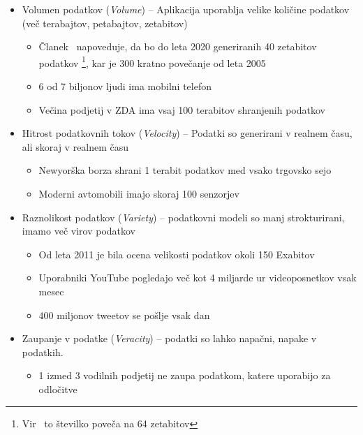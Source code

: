 \begin{itemize} \label{list:four_v}
    \item Volumen podatkov (\emph{Volume}) -- Aplikacija uporablja velike količine podatkov (več terabajtov, petabajtov, zetabitov)
          \begin{itemize}
              \item Članek~\cite{modeling_requirements_big_data} napoveduje, da bo do leta 2020 generiranih 40 zetabitov podatkov
                    \footnote{Vir~\cite{big_data_amount_statista} to številko poveča na 64 zetabitov}, kar je 300 kratno povečanje od leta 2005
              \item 6 od 7 biljonov ljudi ima mobilni telefon
              \item Večina podjetij v ZDA ima vsaj 100 terabitov shranjenih podatkov
          \end{itemize}

    \item Hitrost podatkovnih tokov (\emph{Velocity}) -- Podatki so generirani v realnem času, ali skoraj v realnem času
          \begin{itemize}
              \item Newyorška borza shrani 1 terabit podatkov med vsako trgovsko sejo
              \item Moderni avtomobili imajo skoraj 100 senzorjev
          \end{itemize}

    \item Raznolikost podatkov (\emph{Variety}) -- podatkovni modeli so manj strokturirani, imamo več virov podatkov
          \begin{itemize}
              \item Od leta 2011 je bila ocena velikosti podatkov okoli 150 Exabitov
              \item Uporabniki YouTube pogledajo več kot 4 miljarde ur videoposnetkov vsak mesec
              \item 400 miljonov tweetov se pošlje vsak dan
          \end{itemize}

    \item Zaupanje v podatke (\emph{Veracity}) -- podatki so lahko napačni, napake v podatkih.
          \begin{itemize}
              \item 1 izmed 3 vodilnih podjetij ne zaupa podatkom, katere uporabijo za odločitve
          \end{itemize}
\end{itemize}

